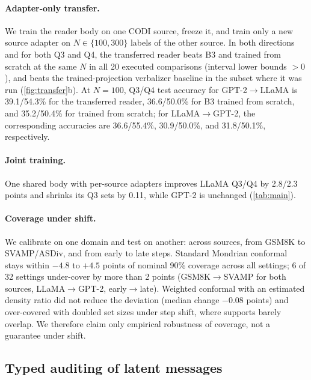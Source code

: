 \paragraph{Adapter-only transfer.} We train the reader body on one CODI source, freeze it, and train only a new source adapter on $N\in\{100,300\}$ labels of the other source. In both directions and for both Q3 and Q4, the transferred reader beats B3 and \clr{} trained from scratch at the same $N$ in all 20 executed comparisons (interval lower bounds $>0$), and beats the trained-projection verbalizer baseline in the subset where it was run (\cref{fig:transfer}b). At $N=100$, Q3/Q4 test accuracy for GPT-2$\to$LLaMA is 39.1/54.3\% for the transferred reader, 36.6/50.0\% for B3 trained from scratch, and 35.2/50.4\% for \clr{} trained from scratch; for LLaMA$\to$GPT-2, the corresponding accuracies are 36.6/55.4\%, 30.9/50.0\%, and 31.8/50.1\%, respectively.

\paragraph{Joint training.} One shared body with per-source adapters improves LLaMA Q3/Q4 by 2.8/2.3 points and shrinks its Q3 sets by 0.11, while GPT-2 is unchanged (\cref{tab:main}).

\paragraph{Coverage under shift.} We calibrate on one domain and test on another: across sources, from GSM8K to SVAMP/ASDiv, and from early to late steps. Standard Mondrian conformal stays within $-4.8$ to $+4.5$ points of nominal 90\% coverage across all settings; 6 of 32 settings under-cover by more than 2 points (GSM8K$\to$SVAMP for both sources, LLaMA$\to$GPT-2, early$\to$late). Weighted conformal with an estimated density ratio did not reduce the deviation (median change $-0.08$ points) and over-covered with doubled set sizes under step shift, where supports barely overlap. We therefore claim only empirical robustness of coverage, not a guarantee under shift.



\subsection{Typed auditing of latent messages}
\label{sec:exp-audit}

